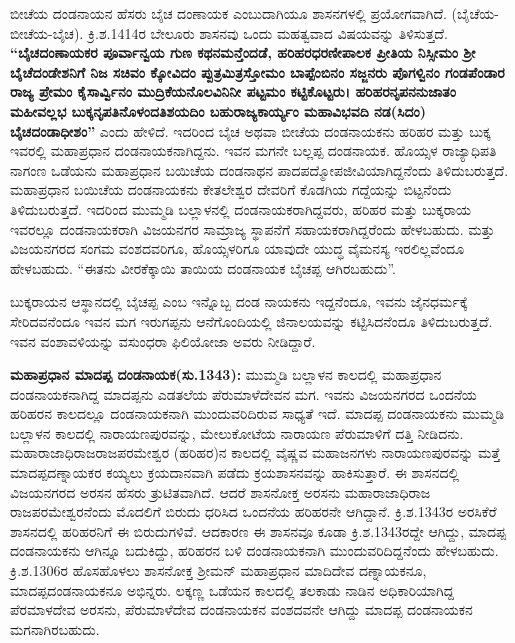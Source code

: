 \vskip 2pt

ಬೀಚೆಯ ದಂಡನಾಯನ ಹೆಸರು ಬೈಚ ದಂಣಾಯಕ ಎಂಬುದಾಗಿಯೂ ಶಾಸನಗಳಲ್ಲಿ ಪ್ರಯೋಗವಾಗಿದೆ. (ಬೈಚೆಯ-ಬೀಚೆಯ-ಬೈಚ). ಕ್ರಿ.ಶ.1414ರ ಬೇಲೂರು ಶಾಸನವು ಒಂದು ಮಹತ್ವವಾದ ವಿಷಯವನ್ನು ತಿಳಿಸುತ್ತದೆ. \textbf{“ಬೈಚದಂಣಾಯಕರ ಪೂರ್ವಾನ್ವಯ ಗುಣ ಕಥನಮನ್ತೆಂದಡೆ, ಹರಿಹರಧರಣೀಪಾಲಕ ಪ್ರೀತಿಯ ನಿಸ್ಸೀಮಂ ಶ‍್ರೀ ಬೈಚೆದಂಡೇಶ\-ನಿಗೆ ನಿಜ ಸಚಿವಂ ಕ್ಕೋವಿದಂ ಪ್ಪುತ್ರಮಿತ್ರಸ್ತೋಮಂ ಬಾಪ್ಪೆಂಬಿನಂ ಸಜ್ಜನರು ಪೊಗಳ್ವಿನಂ ಗಂಡಪೆಂಡಾರ ರಾಜ್ಯ ಪ್ರೇಮಂ ಕೈಸಾರ್ವ್ವಿನಂ ಮುದ್ರಿಕೆಯನೊಲವಿನಿನೀ ಪಟ್ಟಮಂ ಕಟ್ಟಿಕೊಟ್ಟರು। ಹರಿಹರನೃಪನನುಜಾತಂ ಮಹೀವಲ್ಲಭ ಬುಕ್ಕನೃಪತಿನೊಳಂ\-ದತಿಶಯದಿಂ ಬಹುರಾಜ್ಯಕಾರ್ಯ್ಯಂ ಮಹಾವಿಭವದಿ ನಡ(ಸಿದಂ) ಬೈಚದಂಡಾಧೀಶಂ”} ಎಂದು ಹೇಳಿದೆ. ಇದರಿಂದ ಬೈಚ ಅಥವಾ ಬೀಚೆಯ ದಂಡನಾಯಕನು ಹರಿಹರ ಮತ್ತು ಬುಕ್ಕ ಇವರಲ್ಲಿ ಮಹಾಪ್ರಧಾನ ದಂಡನಾಯಕನಾಗಿದ್ದನು. ಇವನ ಮಗನೇ ಬಲ್ಲಪ್ಪ ದಂಡನಾಯಕ. ಹೊಯ್ಸಳ ರಾಜ್ಯಾಧಿಪತಿ ನಾಗಂಣ ಒಡೆಯನು ಮಹಾಪ್ರಧಾನ ಬಯಿಚೆಯ ದಂಡನಾಥನ ಪಾದಪದ್ಮೋಪಜೀವಿಯಾಗಿದ್ದನೆಂದು ತಿಳಿದುಬರುತ್ತದೆ. ಮಹಾಪ್ರಧಾನ ಬಯಿಚೆಯ ದಂಡನಾಯಕನು ಕೇತಲೇಶ್ವರ ದೇವರಿಗೆ ಕೊಡಗಿಯ ಗದ್ದೆಯನ್ನು ಬಿಟ್ಟನೆಂದು ತಿಳಿದುಬರುತ್ತದೆ. ಇದರಿಂದ ಮುಮ್ಮಡಿ ಬಲ್ಲಾಳನಲ್ಲಿ ದಂಡನಾಯಕರಾಗಿ\-ದ್ದವರು, ಹರಿಹರ ಮತ್ತು ಬುಕ್ಕರಾಯ ಇವರಲ್ಲೂ ದಂಡನಾಯಕರಾಗಿ ವಿಜಯನಗರ ಸಾಮ್ರಾಜ್ಯ ಸ್ಥಾಪನೆಗೆ ಸಹಾಯಕರಾಗಿ\-ದ್ದರೆಂದು ಹೇಳಬಹುದು. ಮತ್ತು ವಿಜಯನಗರದ ಸಂಗಮ ವಂಶದವರಿಗೂ, ಹೊಯ್ಸಳರಿಗೂ ಯಾವುದೇ ಯುದ್ಧ ವೈಮನಸ್ಯ ಇರಲಿಲ್ಲವೆಂದೂ ಹೇಳಬಹುದು. “ಈತನು ವೀರಕೆಕ್ಕಾಯಿ ತಾಯಿಯ ದಂಡನಾಯಕ ಬೈಚಪ್ಪ ಆಗಿರಬಹುದು”.

\vskip 2pt

ಬುಕ್ಕರಾಯನ ಆಸ್ಥಾನದಲ್ಲಿ ಬೈಚಪ್ಪ ಎಂಬ ಇನ್ನೊಬ್ಬ ದಂಡ ನಾಯಕನು ಇದ್ದನೆಂದೂ, ಇವನು ಜೈನಧರ್ಮಕ್ಕೆ ಸೇರಿದವನೆಂದೂ ಇವನ ಮಗ ಇರುಗಪ್ಪನು ಆನೆಗೊಂದಿಯಲ್ಲಿ ಜಿನಾಲಯವನ್ನು ಕಟ್ಟಿಸಿದನೆಂದೂ ತಿಳಿದುಬರುತ್ತದೆ. ಇವನ ವಂಶಾವಳಿಯನ್ನು ವಸುಂಧರಾ ಫಿಲಿಯೋಜಾ ಅವರು ನೀಡಿದ್ದಾರೆ.

\newpage

\textbf{ಮಹಾಪ್ರಧಾನ ಮಾದಪ್ಪ ದಂಡನಾಯಕ(ಸು.1343):} ಮುಮ್ಮಡಿ ಬಲ್ಲಾಳನ ಕಾಲದಲ್ಲಿ ಮಹಾಪ್ರಧಾನ ದಂಡ\-ನಾಯಕ\-ನಾಗಿದ್ದ ಮಾದಪ್ಪನು ಎಡತಲೆಯ ಪೆರುಮಾಳೆದೇವನ ಮಗ. ಇವನು ವಿಜಯನಗರದ ಒಂದನೆಯ ಹರಿಹರನ ಕಾಲದಲ್ಲೂ ದಂಡನಾಯಕನಾಗಿ ಮುಂದುವರಿದಿರುವ ಸಾಧ್ಯತೆ ಇದೆ. ಮಾದಪ್ಪ ದಂಡನಾಯಕನು ಮುಮ್ಮಡಿ ಬಲ್ಲಾಳನ ಕಾಲದಲ್ಲಿ ನಾರಾಯಣಪುರವನ್ನು, ಮೇಲುಕೋಟೆಯ ನಾರಾಯಣ ಪೆರುಮಾಳಿಗೆ ದತ್ತಿ ನೀಡಿದನು. ಮಹಾರಾಜಾಧಿರಾಜ\break ರಾಜಪರಮೇಶ್ವರ (ಹರಿಹರ)ನ ಕಾಲದಲ್ಲಿ ವೈಷ್ಣವ ಮಹಾಜನಗಳು ನಾರಾಯಣಪುರವನ್ನು ಮತ್ತೆ ಮಾದಪ್ಪದಣ್ನಾಯಕರ ಕಯ್ಯಲು ಕ್ರಯದಾನವಾಗಿ ಪಡೆದು ಕ್ರಯಶಾಸನವನ್ನು ಹಾಕಿಸುತ್ತಾರೆ. ಈ ಶಾಸನದಲ್ಲಿ ವಿಜಯನಗರದ ಅರಸನ ಹೆಸರು ತ್ರುಟಿತವಾಗಿದೆ. ಆದರೆ ಶಾಸನೋಕ್ತ ಅರಸನು ಮಹಾರಾಜಾಧಿರಾಜ ರಾಜಪರಮೇಶ್ವರನೆಂದು ಮೊದಲಿಗೆ ಬಿರುದು ಧರಿಸಿದ ಒಂದನೆಯ ಹರಿಹರನೇ ಆಗಿದ್ದಾನೆ. ಕ್ರಿ.ಶ.1343ರ ಅರಸಿಕೆರೆ ಶಾಸನದಲ್ಲಿ ಹರಿಹರನಿಗೆ ಈ ಬಿರುದುಗಳಿವೆ. ಆದಕಾರಣ ಈ ಶಾಸನವೂ ಕೂಡಾ ಕ್ರಿ.ಶ.1343ರದ್ದೇ ಆಗಿದ್ದು, ಮಾದಪ್ಪ ದಂಡನಾಯಕನು ಆಗಿನ್ನೂ ಬದುಕಿದ್ದು, ಹರಿಹರನ ಬಳಿ ದಂಡನಾಯಕನಾಗಿ ಮುಂದುವರಿದಿದ್ದನೆಂದು ಹೇಳಬಹುದು. ಕ್ರಿ.ಶ.1306ರ ಹೊಸಹೊಳಲು ಶಾಸನೋಕ್ತ ಶ‍್ರೀಮನ್​ ಮಹಾಪ್ರಧಾನ ಮಾದಿದೇವ ದಣ್ನಾಯಕನೂ, ಮಾದಪ್ಪದಂಡನಾಯಕನೂ ಅಭಿನ್ನರು. ಲಕ್ಕಣ್ಣ ಒಡೆಯನ ಕಾಲದಲ್ಲಿ ತಲಕಾಡು ನಾಡಿನ ಅಧಿಕಾರಿಯಾಗಿದ್ದ ಪೆರಮಾಳದೇವ ಅರಸನು, ಪೆರುಮಾಳೆದೇವ ದಂಡನಾಯಕನ ವಂಶದವನೇ ಆಗಿದ್ದು ಮಾದಪ್ಪ ದಂಡನಾಯಕನ ಮಗನಾಗಿರಬಹುದು.

